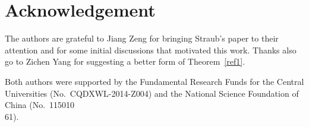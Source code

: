 \documentclass[12pt]{amsart}
\numberwithin{equation}{section}
\theoremstyle{plain}
\theoremstyle{definition}
\begin{document}
\section*{Acknowledgement}
The authors are grateful to Jiang Zeng for bringing Straub's paper \cite{Str} to their attention and for some initial discussions that motivated this work. Thanks also go to Zichen Yang for suggesting a better form of Theorem~\ref{ref1}.


Both authors were supported by the Fundamental Research Funds for the Central Universities (No.~CQDXWL-2014-Z004) and the National Science Foundation of China (No.~115010\\61).
\end{document}
